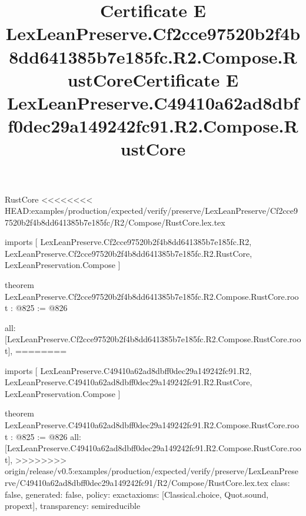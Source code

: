 \begin{lexlean}{RustCore}
<<<<<<<< HEAD:examples/production/expected/verify/preserve/LexLeanPreserve/Cf2cce97520b2f4b8dd641385b7e185fc/R2/Compose/RustCore.lex.tex
\title{Certificate E LexLeanPreserve.Cf2cce97520b2f4b8dd641385b7e185fc.R2.Compose.RustCore}
\begin{coremodule}
imports [
  LexLeanPreserve.Cf2cce97520b2f4b8dd641385b7e185fc.R2,
  LexLeanPreserve.Cf2cce97520b2f4b8dd641385b7e185fc.R2.RustCore,
  LexLeanPreservation.Compose
]

theorem LexLeanPreserve.Cf2cce97520b2f4b8dd641385b7e185fc.R2.Compose.RustCore.root : @825 := @826 {
  all: [LexLeanPreserve.Cf2cce97520b2f4b8dd641385b7e185fc.R2.Compose.RustCore.root],
========
\title{Certificate E LexLeanPreserve.C49410a62ad8dbff0dec29a149242fc91.R2.Compose.RustCore}
\begin{coremodule}
imports [
  LexLeanPreserve.C49410a62ad8dbff0dec29a149242fc91.R2,
  LexLeanPreserve.C49410a62ad8dbff0dec29a149242fc91.R2.RustCore,
  LexLeanPreservation.Compose
]

theorem LexLeanPreserve.C49410a62ad8dbff0dec29a149242fc91.R2.Compose.RustCore.root : @825 := @826 {
  all: [LexLeanPreserve.C49410a62ad8dbff0dec29a149242fc91.R2.Compose.RustCore.root],
>>>>>>>> origin/release/v0.5:examples/production/expected/verify/preserve/LexLeanPreserve/C49410a62ad8dbff0dec29a149242fc91/R2/Compose/RustCore.lex.tex
  class: false,
  generated: false,
  policy: exact{axioms: [Classical.choice, Quot.sound, propext]},
  transparency: semireducible
}


\end{coremodule}}
\end{coremodule}
\end{lexlean}
